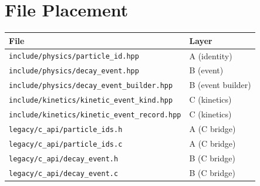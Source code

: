 \documentclass[11pt,a4paper]{article}
\begin{document}
\section{File Placement}
\label{sec:files}

\begin{center}
\begin{tabular}{ll}
\toprule
\textbf{File} & \textbf{Layer} \\
\midrule
\texttt{include/physics/particle\_id.hpp}            & A (identity) \\
\texttt{include/physics/decay\_event.hpp}             & B (event) \\
\texttt{include/physics/decay\_event\_builder.hpp}    & B (event builder) \\
\texttt{include/kinetics/kinetic\_event\_kind.hpp}    & C (kinetics) \\
\texttt{include/kinetics/kinetic\_event\_record.hpp}  & C (kinetics) \\
\texttt{legacy/c\_api/particle\_ids.h}                & A (C bridge) \\
\texttt{legacy/c\_api/particle\_ids.c}                & A (C bridge) \\
\texttt{legacy/c\_api/decay\_event.h}                 & B (C bridge) \\
\texttt{legacy/c\_api/decay\_event.c}                 & B (C bridge) \\
\bottomrule
\end{tabular}
\end{center}
\end{document}
